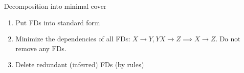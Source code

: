 \begin{theorem}

\end{theorem}

\begin{theorem}
    {Decomposition into minimal cover}

    \begin{enumerate}
        \item Put FDs into standard form
        \item Minimize the dependencies of all FDs: $X \to Y, YX \to Z \implies X \to Z$. Do not remove any FDs.
        \item Delete redundant (inferred) FDs (by rules)
    \end{enumerate}
\end{theorem}

